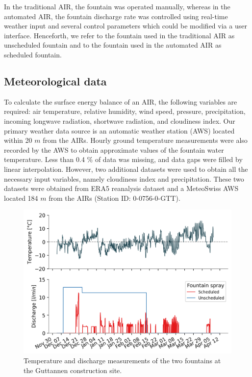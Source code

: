 \documentclass[tc, manuscript]{copernicus}
\begin{document}
In the traditional AIR, the fountain was operated manually, whereas in the automated AIR, the fountain
discharge rate was controlled using real-time weather input and several control parameters which could be
modified via a user interface. Henceforth, we refer to the fountain used in the traditional AIR as unscheduled fountain and to the fountain used in the automated
AIR as scheduled fountain.


\subsection{Meteorological data}

To calculate the surface energy balance of an AIR, the following variables are required: air temperature, relative humidity, wind speed, pressure, precipitation, incoming longwave radiation,
shortwave radiation, and cloudiness index. Our
primary weather data source is an automatic weather station (AWS) located within 20 $m$ from the AIRs. Hourly ground
temperature measurements were also recorded by the AWS to obtain approximate values of the fountain water temperature. Less
than 0.4 \% of data was missing, and data gaps were filled by linear interpolation. However,
two additional datasets were used to obtain all the necessary input variables, namely cloudiness index and
precipitation. These two datasets were obtained from ERA5 reanalysis dataset
\citep{hersbachERA5GlobalReanalysis2020} and a MeteoSwiss AWS located 184 $m$ from the AIRs (Station ID: 0-0756-0-GTT).

\begin{figure}[htb]
\includegraphics[width=12cm]{Figures/disvstemp.png}
\caption{Temperature and discharge measurements of the two fountains at the Guttannen construction site.}
\label{fig:aws} 
\end{figure}
\end{document}
